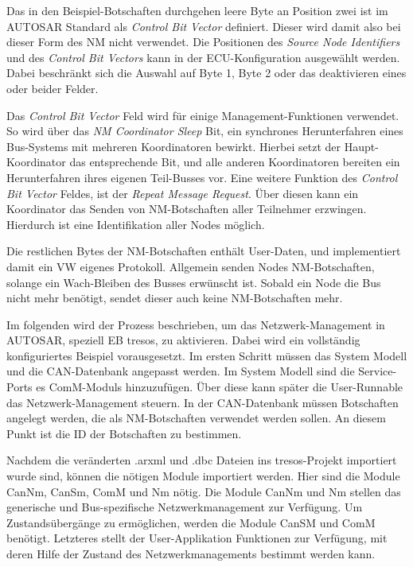 \documentclass[
  a4paper,					    %
  twoside,
  DIV=calc,     				%
  bibliography=totoc,
  cleardoublepage=empty,
  ngerman,     					%
  final       					%
]{scrbook}
\begin{document}
Das in den Beispiel-Botschaften durchgehen leere Byte an Position zwei ist im AUTOSAR Standard als \emph{Control Bit Vector} definiert. Dieser wird damit also bei dieser Form des NM nicht verwendet. Die Positionen des \emph{Source Node Identifiers} und des \emph{Control Bit Vectors} kann in der ECU-Konfiguration ausgewählt werden. Dabei beschränkt sich die Auswahl auf Byte 1, Byte 2 oder das deaktivieren eines oder beider Felder. 

Das \emph{Control Bit Vector} Feld wird für einige Management-Funktionen verwendet. So wird über das \emph{NM Coordinator Sleep} Bit, ein synchrones Herunterfahren eines Bus-Systems mit mehreren Koordinatoren bewirkt. Hierbei setzt der Haupt-Koordinator das entsprechende Bit, und alle anderen Koordinatoren bereiten ein Herunterfahren ihres eigenen Teil-Busses vor. Eine weitere Funktion des \emph{Control Bit Vector} Feldes, ist der \emph{Repeat Message Request}. Über diesen kann ein Koordinator das Senden von NM-Botschaften aller Teilnehmer erzwingen. Hierdurch ist eine Identifikation aller Nodes möglich.

Die restlichen Bytes der NM-Botschaften enthält User-Daten, und implementiert damit ein VW eigenes Protokoll. Allgemein senden Nodes NM-Botschaften, solange ein Wach-Bleiben des Busses erwünscht ist. Sobald ein Node die Bus nicht mehr benötigt, sendet dieser auch keine NM-Botschaften mehr.

Im folgenden wird der Prozess beschrieben, um das Netzwerk-Management in AUTOSAR, speziell EB tresos, zu aktivieren. Dabei wird ein vollständig konfiguriertes Beispiel vorausgesetzt. Im ersten Schritt müssen das System Modell und die CAN-Datenbank angepasst werden. Im System Modell sind die Service-Ports es ComM-Moduls hinzuzufügen. Über diese kann später die User-Runnable das Netzwerk-Management steuern. In der CAN-Datenbank müssen Botschaften angelegt werden, die als NM-Botschaften verwendet werden sollen. An diesem Punkt ist die ID der Botschaften zu bestimmen.

Nachdem die veränderten .arxml und .dbc Dateien ins tresos-Projekt importiert wurde sind, können die nötigen Module importiert werden. Hier sind die Module CanNm, CanSm, ComM und Nm nötig. Die Module CanNm und Nm stellen das generische und Bus-spezifische Netzwerkmanagement zur Verfügung. Um Zustandsübergänge zu ermöglichen, werden die Module CanSM und ComM benötigt. Letzteres stellt der User-Applikation Funktionen zur Verfügung, mit deren Hilfe der Zustand des Netzwerkmanagements bestimmt werden kann.
\end{document}
